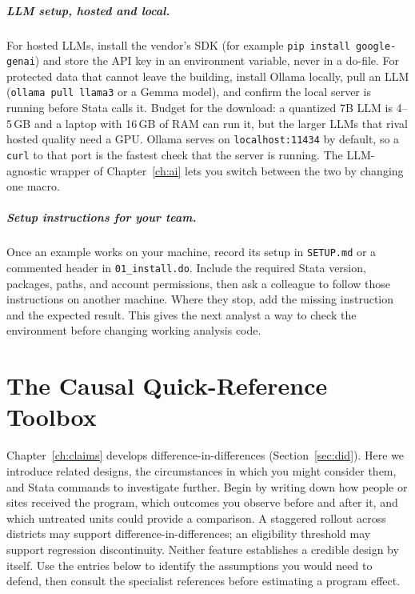 \documentclass[
    a4paper,
    fontsize=10pt,
    twoside=true,
    numbers=noenddot,
]{kaobook}
\begin{document}
\paragraph{LLM setup, hosted and local.} For hosted LLMs, install the vendor's SDK (for example \texttt{pip install google-genai}) and store the API key in an environment variable, never in a do-file. For protected data that cannot leave the building, install Ollama locally, pull an LLM (\texttt{ollama pull llama3} or a Gemma model), and confirm the local server is running before Stata calls it. Budget for the download: a quantized 7B LLM is 4--5\,GB and a laptop with 16\,GB of RAM can run it, but the larger LLMs that rival hosted quality need a GPU. Ollama serves on \texttt{localhost:11434} by default, so a \texttt{curl} to that port is the fastest check that the server is running. The LLM-agnostic wrapper of Chapter~\ref{ch:ai} lets you switch between the two by changing one macro.

\paragraph{Setup instructions for your team.} Once an example works on your machine, record its setup in \texttt{SETUP.md} or a commented header in \texttt{01\_install.do}. Include the required Stata version, packages, paths, and account permissions, then ask a colleague to follow those instructions on another machine. Where they stop, add the missing instruction and the expected result. This gives the next analyst a way to check the environment before changing working analysis code.

\chapter{The Causal Quick-Reference Toolbox}\label{app:causal}
Chapter~\ref{ch:claims} develops difference-in-differences (Section~\ref{sec:did}). Here we introduce related designs, the circumstances in which you might consider them, and Stata commands to investigate further. Begin by writing down how people or sites received the program, which outcomes you observe before and after it, and which untreated units could provide a comparison. A staggered rollout across districts may support difference-in-differences; an eligibility threshold may support regression discontinuity. Neither feature establishes a credible design by itself. Use the entries below to identify the assumptions you would need to defend, then consult the specialist references before estimating a program effect.
\end{document}

